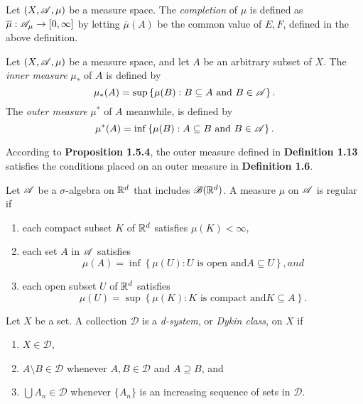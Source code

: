 \documentclass[12pt]{article}
\begin{document}
\begin{definition}
    Let $(X,\mathscr{A},\mu)$ be a measure space. The \textit{completion} of $\mu$ is defined as $\overline{\mu}:\mathscr{A}_\mu\to [0,\infty]$ by letting $\overline{\mu}(A)$ be the common value of $E,F$, defined in the above definition.
\end{definition}
\begin{definition}
    Let $(X,\mathscr{A},\mu)$ be a measure space, and let $A$ be an arbitrary subset of $X$. The \textit{inner measure} $\mu_*$ of $A$ is defined by
    \begin{equation*}
        \mu_*(A)=\sup\left\{\mu(B):B\subseteq A \text{ and } B\in\mathscr{A}\right\}.
    \end{equation*}
    The \textit{outer measure} $\mu^*$ of $A$ meanwhile, is defined by
    \begin{equation*}
        \mu^*(A)=\inf\left\{\mu(B):A\subseteq B \text{ and } B\in\mathscr{A}\right\}.
    \end{equation*}
\end{definition}
\begin{remark}
    According to \textbf{Proposition 1.5.4}, the outer measure defined in \textbf{Definition 1.13} satisfies the conditions placed on an outer measure in \textbf{Definition 1.6}. 
\end{remark}
\begin{definition}
    Let $\mathscr{A}$ be a $\sigma$-algebra on $\mathbb{R}^d$ that includes $\mathscr{B}(\mathbb{R}^d)$. A measure $\mu$ on $\mathscr{A}$ is regular if 
    \begin{enumerate}[label=(\alph*)]
        \item each compact subset $K$ of $\mathbb{R}^d$ satisfies $\mu(K)<\infty$,
        \item each set $A$ in $\mathscr{A}$ satisfies
        \begin{equation*}
            \mu(A)=\inf\left\{\mu(U):U \text{ is open and} A\subseteq U\right\}, and
        \end{equation*}
        \item each open subset $U$ of $\mathbb{R}^d$ satisfies
        \begin{equation*}
            \mu(U)=\sup\left\{\mu(K):K \text{ is compact and} K\subseteq A\right\}.
        \end{equation*}
    \end{enumerate}
\end{definition}
\begin{definition}
    Let $X$ be a set. A collection $\mathscr{D}$ is a \textit{d-system}, or \textit{Dykin class}, on $X$ if
    \begin{enumerate}[label=(\alph*)]
        \item $X\in \mathscr{D}$,
        \item $A\setminus B \in \mathscr{D}$ whenever $A,B\in\mathscr{D}$ and $A\supseteq B$, and
        \item $\bigcup A_n \in \mathscr{D}$ whenever $\{A_n\}$ is an increasing sequence of sets in $\mathscr{D}$.
    \end{enumerate}
\end{definition}
\end{document}
